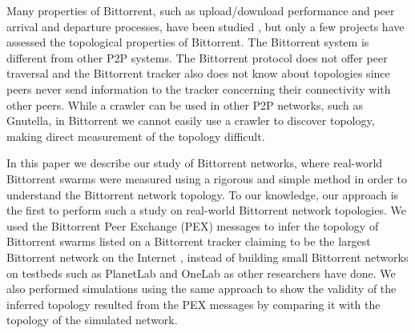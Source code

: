 \documentclass[paper]{ieice}
\begin{document}
Many properties of Bittorrent, such as upload/download performance and peer arrival and departure processes, have been studied \cite{guo2005measurements}, but only a few projects have assessed the topological properties of Bittorrent.
The Bittorrent system is different from other P2P systems.
The Bittorrent protocol does not offer peer traversal and the Bittorrent tracker also does not know about topologies since peers never send information to the tracker concerning their connectivity with other peers. 
While a crawler can be used in other P2P networks, such as Gnutella, in Bittorrent we cannot easily use a crawler to discover topology, making direct measurement of the topology difficult.

In this paper we describe our study of Bittorrent networks, where real-world Bittorrent swarms were measured using a rigorous and simple method in order to understand the Bittorrent network topology. 
To our knowledge, our approach is the first to perform such a study on real-world Bittorrent network topologies. 
We used the Bittorrent Peer Exchange (PEX) messages to infer the topology of Bittorrent swarms listed on a Bittorrent tracker claiming to be the largest Bittorrent network on the Internet  \cite{piratebay}\cite{zhang2010unraveling}, instead of building small Bittorrent networks on testbeds such as PlanetLab and OneLab as other researchers have done. 
We also performed simulations using the same approach to show the validity of the inferred topology  resulted from the PEX messages by comparing it with the topology of the simulated network.
\end{document}
